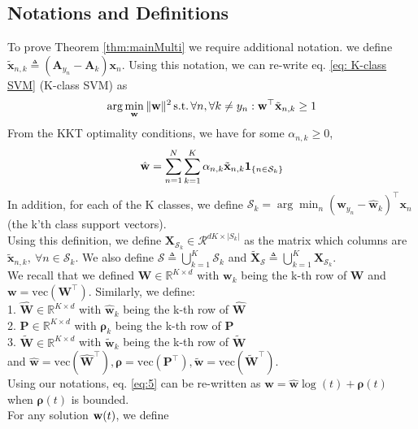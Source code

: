 \documentclass[twoside,11pt,english]{article}
\newcommand{\sumk}{\sum_{k=1}^{K}}
\newcommand{\xtilde}{\tilde{\vect{x}}_{n,k}}
\newcommand{\vect}[1]{\mathbf{#1}}
\newcommand{\bm}[1]{\ensuremath{\boldsymbol{#1}}}
\newcommand{\indicator}[1]{\bm{1}_{\{ #1 \}}}
\begin{document}
\subsection{Notations and Definitions}
To prove Theorem \ref{thm:mainMulti} we require additional notation.  we define $\xtilde \triangleq (\vect{A}_{y_n}-\vect{A}_k)\vect{x}_n$. Using this notation, we can re-write eq. \ref{eq: K-class SVM} (K-class SVM) as
\begin{equation}
    \arg \min_\wvec \Vert \wvec \Vert^2\,\textrm{s.t.}\,\forall n, \forall k\neq y_n: \wvec^\top \xtilde \ge 1  
\end{equation}
From the KKT optimality conditions, we have for some $\alpha_{n,k}\ge 0$, 
\begin{equation} \label{eq: what def with alpha for CE}
	\what = \sumn \sumk \alpha_{n,k} \xtilde \indicator{n\in \mathcal{S}_k}
\end{equation}
In addition, for each of the K classes, we define $\mathcal{S}_k=\arg \min_n(\hat{\vect{w}}_{y_n}-\hat{\vect{w}}_k)^\top\vect{x}_n$ (the k'th class support vectors).\\ Using this definition, we define
$\vect{X}_{\mathcal{S}_k}\in\mathcal{R}^{dK\times |S_k|}$ as the matrix which columns are $\xtilde, \ \forall n\in \mathcal{S}_k$. We also define $\mathcal{S}\triangleq{\bigcup\limits_{k=1}^{K}\mathcal{S}_k} $ and $\tilde{\vect{X}}_\mathcal{S}\triangleq{\bigcup\limits_{k=1}^{K} \vect{X}_{\mathcal{S}_k}}$.\\
We recall that we defined $\vect{W}\in \mathbb{R}^{K\times d}$ with $\vect{w}_k$ being the k-th row of $\vect{W}$ and $\vect{w}=\mathrm{vec}(\vect{W}^\top)$. Similarly, we define:\\
1. $\hat{\vect{W}}\in \mathbb{R}^{K\times d}$ with $\hat{\vect{w}}_k$ being the k-th row of $\hat{\vect{W}}$\\
2. $\vect{P}\in \mathbb{R}^{K\times d}$ with $\bm{\rho}_k$ being the k-th row of $\vect{P}$\\
3. $\tilde{\vect{W}}\in \mathbb{R}^{K\times d}$ with $\tilde{\vect{w}}_k$ being the k-th row of $\tilde{\vect{W}}$\\
and $\hat{\vect{w}}=\mathrm{vec}(\hat{\vect{W}}^\top), \bm{\rho}=\mathrm{vec}(\vect{P}^\top), \tilde{\vect{w}}=\mathrm{vec}(\tilde{\vect{W}}^\top)$.\\
Using our notations, eq. \ref{eq:5} can be re-written as $ \vect{w} = \hat{\vect{w}} \log(t)+\bm{\rho}(t) $ when $\bm{\rho}(t)$ is bounded.\\
For any solution $\mathbf{w}(t)$, we define 
\end{document}
